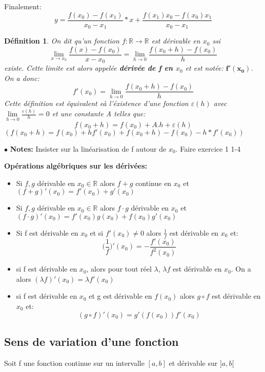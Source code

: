 \documentclass[a4paper]{article}
\theoremstyle{break}
\newtheorem{mydef}{Définition}[section]
\newcommand{\note}{$\bullet$ \textbf{Notes: }}
\begin{document}
\vspace{1\baselineskip}

Finalement:
\[
  y = \frac{f(x_0)-f(x_1)}{x_0-x_1} * x + \frac{f(x_1)x_0 - f(x_0)x_1}{x_0-x_1} 
\]

\begin{mydef}
  On dit qu'un fonction $f:\mathbb{R} \to \mathbb{R}$ est dérivable en
  $x_0$ ssi
  \[
    \lim \limits_{x \to x_0} \frac{f(x)-f(x_0)}{x-x_0} = \lim \limits_{h \to 0} \frac{f(x_0+h)-f(x_0)}{h}
  \]
  existe. Cette limite est alors appelée \textbf{dérivée de f en $x_0$}
  et est notée: $\mathbf{f'(x_0)}$. On a donc:
  \[
    f'(x_0)=\lim \limits_{h \to 0} \frac{f(x_0+h)-f(x_0)}{h}
  \]
  Cette définition est équivalent eà l'éxistence d'une fonction
  $\varepsilon(h)$ avec $\lim \limits_{h \to 0}
  \frac{\varepsilon(h)}{h} = 0$ et une constante A telles que:
  \[
    f(x_0 + h) = f(x_0) + A.h + \varepsilon(h) 
  \]
  $(f(x_0+h) = f(x_0) + hf'(x_0) + f(x_0+h) - f(x_0) - h*f'(x_0))$
\end{mydef}

\note Insister sur la linéarisation de f autour de $x_0$. Faire exercice 1 1-4 

\textbf{Opérations algébriques sur les dérivées:}

\begin{itemize}[label =$\bullet$, leftmargin =2cm]
\item Si $f,g$ dérivable en $x_0 \in \mathbb{R}$ alors $f+g$ continue
  en $x_0$ et $(f+g)'(x_0) = f'(x_0)+g'(x_0)$
\item Si $f,g$ dérivable en $x_0 \in \mathbb{R}$ alors $f \cdot g$ dérivable
  en $x_0$ et $(f \cdot g)'(x_0) = f'(x_0)g(x_0) + f(x_0)g'(x_0)$
\item Si f est dérivable en $x_0$ et si $f'(x_0) \neq 0$ alors
  $\frac{1}{f}$ est dérivable en $x_0$ et:
  \[
    \big( \frac{1}{f} \big)'(x_0) = -\frac{f'(x_0)}{f^2(x_0)}
  \]
\item si f est dérivable en $x_0$, alors pour tout réel $\lambda$,
  $\lambda f$ est dérivable en $x_0$. On a alors $(\lambda f)'(x_0) =
  \lambda f'(x_0)$
\item si f est dérivable en $x_0$ et g est dérivable en $f(x_0)$ alors
  $g \circ f$ est dérivable en $x_0$ et:
  \[
    (g \circ f)'(x_0) = g'(f(x_0)) f'(x_0)
  \]
\end{itemize}

\subsection{Sens de variation d'une fonction}
Soit f une fonction continue sur un intervalle $[a,b]$ et dérivable
sur $]a,b[$
\end{document}
